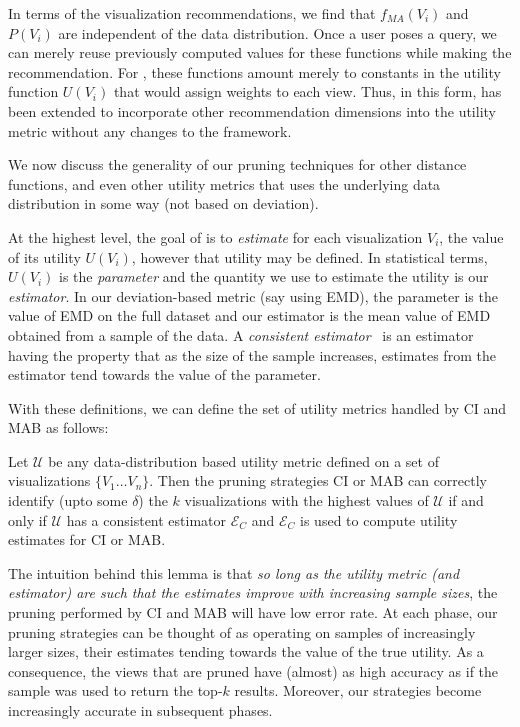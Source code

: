 {In terms of the visualization recommendations, 
we find that $f_{MA}(V_i)$ and $P (V_i)$ are independent
of the data distribution.
Once a user poses a query, we can merely reuse previously 
computed values for these functions while
making the recommendation.
For \SeeDB, these functions amount merely to constants 
in the utility function $U (V_i)$ that would assign weights to each view.
Thus, in this form, \SeeDB has been extended to 
incorporate other recommendation dimensions into
the utility metric without any changes to the \SeeDB framework.
}



We now discuss the generality of our pruning techniques 
for other distance functions, and even other
utility metrics that uses the underlying data distribution in some way (not based on deviation).


At the highest level, the goal of \SeeDB is to {\em estimate} for each visualization $V_i$, 
the value of its utility $U(V_i)$, however that utility may be defined.
In statistical terms, $U(V_i)$ is the {\em parameter} and the quantity we use to estimate the
utility is our {\em estimator}.
In our deviation-based metric (say using EMD), the parameter is the value of EMD on the full
dataset and our estimator is the mean value of EMD obtained from a sample of the data.
A {\em consistent estimator}~\cite{consistent_estimator} is an estimator having the property 
that as the size of the sample increases, estimates from the estimator tend towards the value 
of the parameter. 

With these definitions, we can define the set of utility metrics handled by CI and MAB as follows:
\begin{lemma}
Let $\mathcal{U}$ be any data-distribution based utility metric defined on a set of visualizations $\{
V_1 \ldots V_n\}$. Then the pruning strategies CI or MAB can correctly identify (upto some $\delta$) the 
$k$ visualizations with the highest values of $\mathcal{U}$ if and only if $\mathcal{U}$ has a consistent 
estimator $\mathcal{E}_C$ and $\mathcal{E}_C$ is used to compute utility estimates for CI or MAB.
\end{lemma}

The intuition behind this lemma is that {\em so long as the utility metric (and estimator) are such that
the estimates improve with increasing sample sizes}, the pruning performed by CI and MAB will have low
error rate.
At each phase, our pruning strategies can be thought of as operating on samples of increasingly larger
sizes, their estimates tending towards the value of the true utility.
As a consequence, the views that are pruned have (almost) as high accuracy as if the sample was used to
return the top-$k$ results.
Moreover, our strategies become increasingly accurate in subsequent phases.

